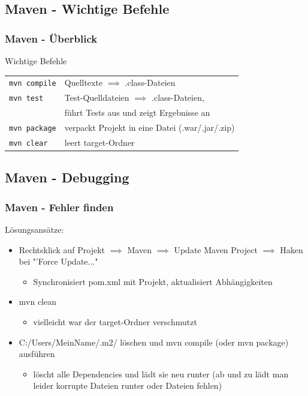 \documentclass[18pt]{beamer}
\begin{document}
	\subsection{Maven - Wichtige Befehle}
	\begin{frame}
		\frametitle{Maven - Überblick}
		\begin{block}{Wichtige Befehle}
			\begin{tabular}{ll}
				\texttt{mvn compile} & Quelltexte $\implies$ .class-Dateien \\ \pause
				\texttt{mvn test} & Test-Quelldateien $\implies$ .class-Dateien, \\ & führt Tests aus und zeigt Ergebnisse an \\ \pause
				\texttt{mvn package} & verpackt Projekt in eine Datei (.war/.jar/.zip) \\ \pause 
				\texttt{mvn clear} & leert  target-Ordner \\
			\end{tabular}
		\end{block}
	\end{frame}
	
	\subsection{Maven - Debugging}
	\begin{frame}
		\frametitle{Maven - Fehler finden}
		Lösungsansätze:
		\begin{itemize}
			\item Rechtsklick auf Projekt $\implies$ Maven $\implies$ Update Maven Project $\implies$ Haken bei "'Force Update..." 
			\begin{itemize}
				\item Synchronisiert pom.xml mit Projekt, aktualisiert Abhängigkeiten
			\end{itemize}
			\pause
			\item mvn clean
			\begin{itemize}
				\item vielleicht war der target-Ordner verschmutzt
			\end{itemize}
			\pause
			\item C:/Users/MeinName/.m2/ löschen und mvn compile (oder mvn package) ausführen
			\begin{itemize}
				\item löscht alle Dependencies und lädt sie neu runter (ab und zu lädt man leider korrupte Dateien runter oder Dateien fehlen)
			\end{itemize}
		\end{itemize}
	\end{frame}
	
\end{document}
